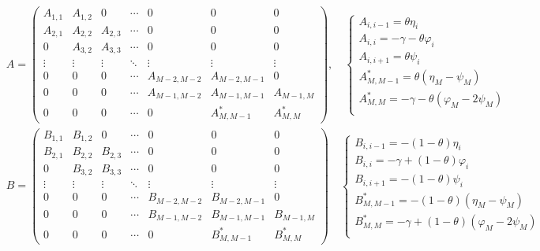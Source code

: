 \begin{align*}
    &\boxed{
        A = \begin{pmatrix}
            A_{1,1} & A_{1,2} & 0 & \cdots & 0 & 0 & 0 \\
            A_{2,1} & A_{2,2} & A_{2,3} & \cdots & 0 & 0 & 0 \\
            0 & A_{3,2} & A_{3,3} & \cdots & 0 & 0 & 0 \\
            \vdots & \vdots & \vdots & \ddots & \vdots & \vdots & \vdots \\
            0 & 0 & 0 & \cdots & A_{M-2,M-2} & A_{M-2,M-1} & 0 \\
            0 & 0 & 0 & \cdots & A_{M-1,M-2} & A_{M-1,M-1} & A_{M-1,M} \\
            0 & 0 & 0 & \cdots & 0 & A_{M,M-1}^* & A_{M,M}^*
        \end{pmatrix},
        \quad \begin{cases}
            A_{i,i-1} = \theta\eta_i \\
            A_{i,i} = -\gamma - \theta \varphi_i \\
            A_{i,i+1} = \theta\psi_i \\
            A_{M,M-1}^* = \theta(\eta_M - \psi_M)\\
            A_{M,M}^* = -\gamma - \theta (\varphi_M - 2\psi_M)\\
        \end{cases}
    } \\
    & \boxed{
        B = \begin{pmatrix}
            B_{1,1} & B_{1,2} & 0 & \cdots & 0 & 0 & 0 \\
            B_{2,1} & B_{2,2} & B_{2,3} & \cdots & 0 & 0 & 0 \\
            0 & B_{3,2} & B_{3,3} & \cdots & 0 & 0 & 0 \\
            \vdots & \vdots & \vdots & \ddots & \vdots & \vdots & \vdots \\
            0 & 0 & 0 & \cdots & B_{M-2,M-2} & B_{M-2,M-1} & 0 \\
            0 & 0 & 0 & \cdots & B_{M-1,M-2} & B_{M-1,M-1} & B_{M-1,M} \\
            0 & 0 & 0 & \cdots & 0 & B_{M,M-1}^* & B_{M,M}^*
        \end{pmatrix}
        \quad \begin{cases}
            B_{i,i-1} = -(1-\theta)\eta_i \\
            B_{i,i} = -\gamma + (1-\theta) \varphi_i \\
            B_{i,i+1} = -(1-\theta)\psi_i \\
            B_{M,M-1}^* = -(1-\theta)(\eta_M - \psi_M)\\
            B_{M,M}^* = -\gamma + (1-\theta) (\varphi_M - 2\psi_M)\\
        \end{cases}
    }
\end{align*}
